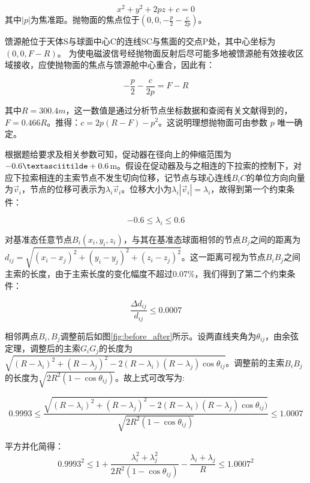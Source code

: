\documentclass[withoutpreface,bwprint,fontset=macnew]{cumcmthesis} %
\begin{document}
	\begin{equation*}
		x^2 + y^2 + 2pz + c = 0
		\label{eq:paraboloid}
	\end{equation*}
	其中$|p|$为焦准距。抛物面的焦点位于$(0, 0, -\frac{p}{2}-\frac{c}{2p})$。
	
	
	馈源舱位于天体S与球面中心C的连线SC与焦面的交点P处，其中心坐标为$(0, 0, F-R)$。
	为使电磁波信号经抛物面反射后尽可能多地被馈源舱有效接收区域接收，应使抛物面的焦点与馈源舱中心重合，因此有：
	
	\begin{equation*}
		-\frac{p}{2}-\frac{c}{2p} = F-R
		\label{eq:foci}
	\end{equation*}

	其中$R = 300.4m$，这一数值是通过分析节点坐标数据和查阅有关文献得到的，$F = 0.466R$。推得：$c=2p(R-F)-p^2$。这说明理想抛物面可由参数 $p$ 唯一确定。
	
	根据题给要求及相关参数可知，促动器在径向上的伸缩范围为$-0.6 \textasciitilde +0.6$m。假设在促动器及与之相连的下拉索的控制下，对应下拉索相连的主索节点不发生切向位移，记节点与球心连线$B_{i} C$的单位方向向量为$\vec{v}_i$，节点的位移可表示为$\lambda_i \vec{v}_i$。位移大小为$\lambda_i|\vec{v}_i| = \lambda_i$，故得到第一个约束条件：
	
	\begin{equation}
		-0.6 \leq \lambda_i \leq 0.6
		\label{eq:bound2}
	\end{equation}

	对基准态任意节点$B_{i}(x_i, y_i, z_i)$，与其在基准态球面相邻的节点$B_{j}$之间的距离为$d_{ij} = \sqrt{(x_i-x_j)^2+(y_i-y_j)^2+(z_i-z_j)^2}$。这一距离可视为节点$B_{i}B_{j}$之间主索的长度，由于主索长度的变化幅度不超过0.07\%，我们得到了第二个约束条件：
	
	\begin{equation*}
		\frac{\Delta d_{ij}}{d_{ij}}\leqslant 0.0007
		\label{eq:bound1}
	\end{equation*}
	
	相邻两点$B_{i},B_{j}$调整前后如图\ref {fig:before_after}所示。设两直线夹角为$\theta_{ij}$，由余弦定理，调整后的主索$G_{i}G_{j}$的长度为$\sqrt{(R-\lambda_i)^2+(R-\lambda_j)^2-2(R-\lambda_i)(R-\lambda_j)\cos\theta_{ij}}$。调整前的主索$B_{i}B_{j}$的长度为$\sqrt{2R^2(1-\cos\theta_{ij})}$。故上式可改写为:
	
	$$0.9993 \leqslant \frac{\sqrt{(R-\lambda_i)^2+(R-\lambda_j)^2-2(R-\lambda_i)(R-\lambda_j)\cos\theta_{ij})}}{\sqrt{2R^2(1-\cos\theta_{ij})}} \leqslant 1.0007$$
	
	平方并化简得：
	\begin{equation}
		0.9993^2 \leqslant 1+\frac{\lambda_i^2+\lambda_j^2}{2R^2(1-\cos\theta_{ij})}-\frac{\lambda_i+\lambda_j}{R} \leqslant 1.0007^2
		\label{eq:bound1_transform}
	\end{equation}
	
\end{document}
